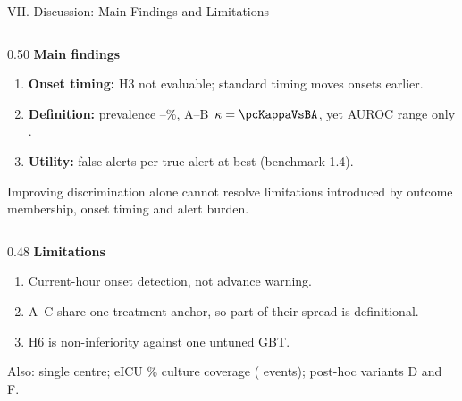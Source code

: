 \begin{frame}{VII. Discussion: Main Findings and Limitations}
\begin{atucols}[t]
\begin{column}{0.50\textwidth}
\textbf{Main findings}
\begin{enumerate}\itemsep3pt\footnotesize
  \item \textbf{Onset timing:} H3 not evaluable; standard timing moves
        \pcFNMovedEarlier{} onsets earlier.
  \item \textbf{Definition:} prevalence \pcPctOnsetsA--\pcPctOnsetsC\%,
        A--B~$\kappa = \pcKappaVsBA$, yet AUROC range only \pcSpreadLabel.
  \item \textbf{Utility:} \pcUtilityOptBurdenGbtB{} false alerts per true
        alert at best (benchmark 1.4).
\end{enumerate}
\vspace{2pt}
\begin{alertblock}{}
  \footnotesize Improving discrimination alone cannot resolve limitations
  introduced by outcome membership, onset timing and alert burden.
\end{alertblock}
\end{column}
\begin{column}{0.48\textwidth}
\textbf{Limitations}
\begin{enumerate}\itemsep3pt\footnotesize
  \item Current-hour onset detection, not advance warning.
  \item A--C share one treatment anchor, so part of their spread is
        definitional.
  \item H6 is non-inferiority against one untuned GBT.
\end{enumerate}
\vspace{2pt}
{\scriptsize\color{MidGrey} Also: single centre; eICU
\pcExtMicroCoverage\% culture coverage (\pcExtNEventsB{} events); post-hoc
variants D and F.\par}
\end{column}
\end{atucols}


\end{frame}
